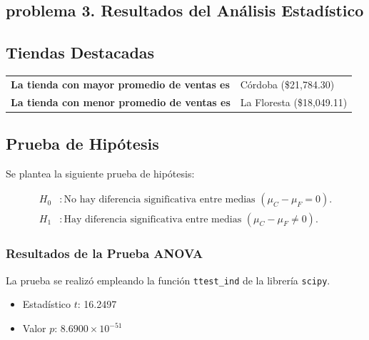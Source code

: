 \subsection{problema 3. Resultados del Análisis Estadístico}

\subsection*{Tiendas Destacadas}
\begin{tabular}{@{}ll@{}}
\toprule
\textbf{La tienda con mayor promedio de ventas es} & C\'ordoba (\$21,784.30) \\
\textbf{La tienda con menor promedio de ventas es} & La Floresta (\$18,049.11) \\
\bottomrule
\end{tabular}


\subsection*{Prueba de Hip\'otesis}

Se plantea la siguiente prueba de hip\'otesis:

\begin{align*}
H_0 &: \text{No hay diferencia significativa entre medias } (\mu_C - \mu_F = 0). \\
H_1 &: \text{Hay diferencia significativa entre medias } (\mu_C - \mu_F \neq 0).
\end{align*}

\subsubsection*{Resultados de la Prueba ANOVA}
La prueba se realiz\'o empleando la funci\'on \texttt{ttest\_ind} de la librer\'ia \texttt{scipy}.

\begin{itemize}
    \item Estad\'istico $t$: 16.2497
    \item Valor $p$: $8.6900 \times 10^{-51}$
\end{itemize}

